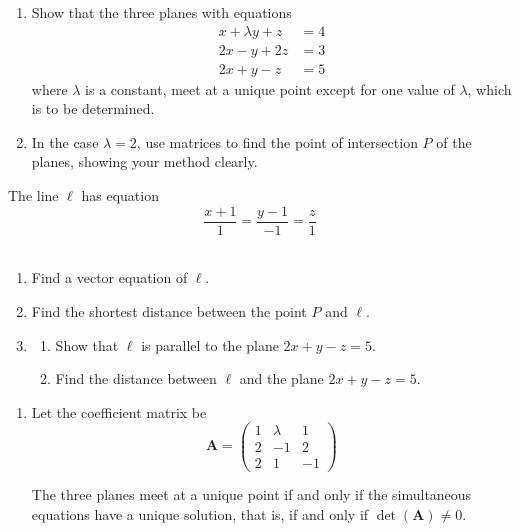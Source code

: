 \documentclass[leqno]{article}
\begin{document}
\begin{enumerate}[
  label=\textbf{\arabic*.},
  leftmargin=*,
  topsep=0pt,
  partopsep=0pt,
  parsep=0pt
]
\begin{enumerate}[label=\textbf{(\alph*)}]
  \item Show that the three planes with equations
  \[
  \begin{aligned}
  x+\lambda y+z&=4 \\
  2x-y+2z&=3 \\
  2x+y-z&=5
  \end{aligned}
  \]
  where $\lambda$ is a constant, meet at a unique point except for one value of $\lambda$, which is to be determined. \\
  \item In the case $\lambda=2$, use matrices to find the point of intersection $P$ of the planes, showing your method clearly.  \\
\end{enumerate}
The line $\ell$ has equation
\[
\frac{x+1}{1}=\frac{y-1}{-1}=\frac{z}{1}
\] \\
\begin{enumerate}[label=\textbf{(\alph*)}, resume]
  \item Find a vector equation of $\ell$.  \\
  \item Find the shortest distance between the point $P$ and $\ell$.  \\
  \item
  \begin{enumerate}[label=(\roman*)]
    \item Show that $\ell$ is parallel to the plane $2x+y-z=5$. 
    \item Find the distance between $\ell$ and the plane $2x+y-z=5$.  \\
  \end{enumerate}
\end{enumerate}

\vspace*{10pt}

\begin{djsSolution}
\begin{enumerate}[label=\textbf{(\alph*)}]
  \item Let the coefficient matrix be
\[
\mathbf{A}=\begin{pmatrix}
1 & \lambda & 1\\
2 & -1 & 2\\
2 & 1 & -1
\end{pmatrix}
\]

The three planes meet at a unique point if and only if the simultaneous equations have a unique solution, that is, if and only if $\det(\mathbf{A})\neq 0$.


\end{enumerate}
\end{djsSolution}
\end{enumerate}
\end{document}
